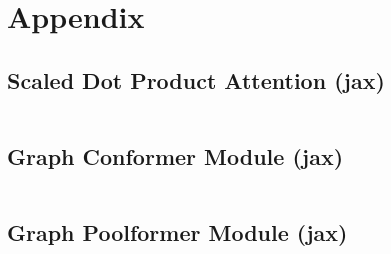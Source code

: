 \chapter{Appendix}
\label{sec:appendix}



% 

\newpage
\section{Scaled Dot Product Attention (jax)} \label{appendix:attention}
    \inputminted[firstline=149, lastline=169]{python}{./../physics-code/models/metaformer.py}

\section{Graph Conformer Module (jax)} \label{appendix:graph-conformer}
    \inputminted[firstline=242, lastline=284]{python}{./../physics-code/models/metaformer.py}

\newpage
\section{Graph Poolformer Module (jax)} \label{appendix:graph-poolformer}
    \inputminted[firstline=211, lastline=239]{python}{./../physics-code/models/metaformer.py}
    
